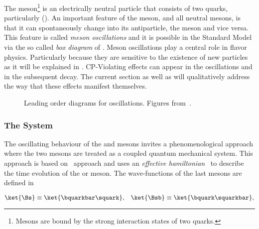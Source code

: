 

The \Bs meson\footnote{Mesons are bound by the strong interaction states of two quarks.} is an electrically neutral
particle that consists of two quarks, particularly (\bquarkbar\squark). An important feature of
the \Bs meson, and all neutral mesons, is that it can spontaneously change into its antiparticle,
the \Bsb meson and vice versa. This feature is called {\it meson oscillations} and it is possible
in the Standard Model via the so called {\it box diagram} of .
Meson oscillations play a central role in flavor physics. Particularly because they are sensitive to the
existence of new particles as it will be explained in . CP-Violating effects can
appear in the \BBbarSyst oscillations and in the subsequent decay. The current section as well
as  will qualitatively address the way that these effects manifest themselves.

\begin{figure}[h]
  \centering
  \begin{subfigure}{0.5\textwidth}
    \centering
    {\sffamily }
    \caption{}
    \label{bs_box_1}
  \end{subfigure}%
  \begin{subfigure}{0.5\textwidth}
    \centering
    {\sffamily }
    \caption{}
    \label{bs_box_2}
  \end{subfigure}
  \caption{Leading order diagrams for \BBbarSyst oscillations. Figures from~\cite{jeroenThesis}.}
  \label{bs_box}
\end{figure}

\subsubsection{The \BBbarSyst System}
\label{the_bbar_system}

The oscillating behaviour of the \Bs and \Bsb mesons invites a phenomenological approach
where the two mesons are treated as a coupled quantum mechanical system. This approach
is based on~\cite{Weisskopf:1930au,Weisskopf:1930ps} approach and uses an {\it effective hamiltonian}~\cite{eff-hamiltonian-bs-syst,DeBruyn-thesis}
to describe the time evolution of the \Bs or \Bsb meson. The wave-functions of the last mesons
are defined in 

\begin{equation}
\ket{\Bs}  \equiv  \ket{\bquarkbar\squark}, \;\;\; \ket{\Bsb} \equiv  \ket{\bquark\squarkbar},
\label{bs_wavefunctions}
\end{equation}

